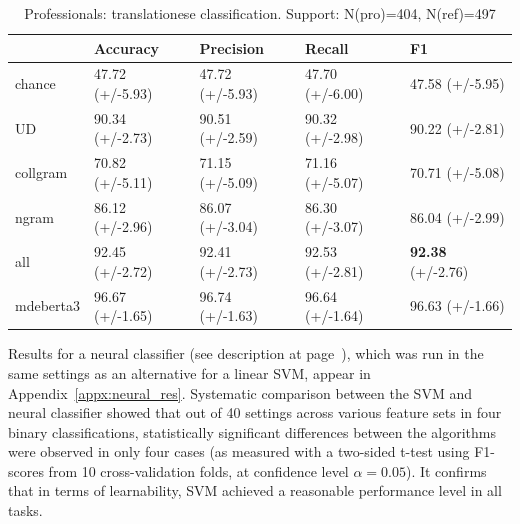 \begin{table}[H]
	\centering
	\begin{tabular}{p{2.9cm}|llll}
		\toprule
		& Accuracy        & Precision       & Recall        & F1              \\
		\midrule
		chance          & 47.72 (+/-5.93) & 47.72 (+/-5.93) & 47.70 (+/-6.00) & 47.58 (+/-5.95) \\
		\midrule
		UD              & 90.34 (+/-2.73) & 90.51 (+/-2.59) & 90.32 (+/-2.98) & 90.22 (+/-2.81) \\
		collgram        & 70.82 (+/-5.11) & 71.15 (+/-5.09) & 71.16 (+/-5.07) & 70.71 (+/-5.08) \\
		ngram           & 86.12 (+/-2.96) & 86.07 (+/-3.04) & 86.30 (+/-3.07) & 86.04 (+/-2.99) \\
		all             & 92.45 (+/-2.72) & 92.41 (+/-2.73) & 92.53 (+/-2.81) & \textbf{92.38} (+/-2.76) \\
		\midrule
		mdeberta3  & 96.67 (+/-1.65) & 96.74 (+/-1.63) & 96.64 (+/-1.64) & \boxit{0.4in} 96.63 (+/-1.66)\\		
		\bottomrule
	\end{tabular}
	\caption{\label{tab:pro-ref}Professionals: translationese classification. Support: N(pro)=404, N(ref)=497}
\end{table}

Results for a neural classifier (see description at page~\pageref{pg:neural}), which was run in the same settings as an alternative for a linear SVM, appear in Appendix~\ref{appx:neural_res}. Systematic comparison between the SVM and neural classifier showed that out of 40 settings across various feature sets in four binary classifications, statistically significant differences between the algorithms were observed in only four cases (as measured with a two-sided t-test using F1-scores from 10 cross-validation folds, at confidence level $\alpha=0.05$). It confirms that in terms of learnability, SVM achieved a reasonable performance level in all tasks. 

